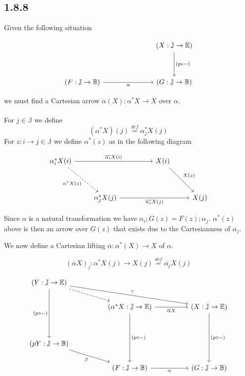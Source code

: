 \documentclass{article}
\newcommand{\defeq}{\overset{\mathit{def}}{=}}
\begin{document}
\subsection*{1.8.8}

Given the following situation

\[\begin{tikzcd}
	&&& {(X: \mathbb J \to \mathbb E)} \\
	\\
	{(F : \mathbb J \to \mathbb B)} &&& {(G : \mathbb J \to \mathbb B)}
	\arrow["{(p \circ -)}", from=1-4, to=3-4]
	\arrow["\alpha"', from=3-1, to=3-4]
\end{tikzcd}\]

we must find a Cartesian arrow $\overline{\alpha}(X) : \alpha^*X \to X$ over $\alpha$.\\~\\
For $j \in \mathbb J$ we define $$(\alpha^*X)(j) \defeq \alpha_j^*X(j)$$
For $z : i \to j \in \mathbb J$ we define $\alpha^*(z)$ as in the following diagram 

\[\begin{tikzcd}
	{\alpha_i^*X(i)} &&& {X(i)} \\
	\\
	& {\alpha^*_j X(j)} &&& {X(j)}
	\arrow["{\overline{\alpha_i}X(i)}", from=1-1, to=1-4]
	\arrow["{X(z)}", from=1-4, to=3-5]
	\arrow["{\overline{\alpha_j} X(j)}"', from=3-2, to=3-5]
	\arrow["{\alpha^* X(z)}"', dashed, from=1-1, to=3-2]
\end{tikzcd}\]

Since $\alpha$ is a natural transformation we have $\alpha_i;G(z) = F(z);\alpha_j$. $\alpha^*(z)$ above is then an arrow over $G(z)$ that exists due to the Cartesianness of $\overline{\alpha_j}$. 

We now define a Cartesian lifting $\overline{\alpha} : \alpha^*(X) \to X$ of $\alpha$.

$$(\overline{\alpha} X)_j : \alpha^*X(j) \to X(j) \defeq \overline{\alpha_j} X(j) $$

\[\begin{tikzcd}
	{(Y : \mathbb J \to \mathbb E)} \\
	&& {(\alpha^* X : \mathbb J \to \mathbb E)} && {(X : \mathbb J \to \mathbb E)} \\
	\\
	{(pY : \mathbb J \to \mathbb B)} \\
	&& {(F : \mathbb J \to \mathbb B)} && {(G : \mathbb J \to \mathbb B)}
	\arrow["\alpha"', from=5-3, to=5-5]
	\arrow["\beta"', from=4-1, to=5-3]
	\arrow["{\overline{\alpha}X}"', from=2-3, to=2-5]
	\arrow["\gamma", from=1-1, to=2-5]
	\arrow["{(p \circ -)}", from=2-5, to=5-5]
	\arrow["{(p \circ -)}", from=2-3, to=5-3]
	\arrow["{(p \circ -)}"', from=1-1, to=4-1]
	\arrow[dashed, from=1-1, to=2-3]
\end{tikzcd}\]
\end{document}

